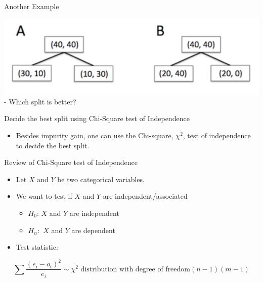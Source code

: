 \documentclass[
  ignorenonframetext,
]{beamer}
\providecommand{\tightlist}{%
  \setlength{\itemsep}{0pt}\setlength{\parskip}{0pt}}
\begin{document}
\begin{frame}{Another Example}
\protect\hypertarget{another-example}{}

\includegraphics{images2/i1.png} - Which split is better?

\end{frame}

\begin{frame}{Decide the best split using Chi-Square test of
Independence}
\protect\hypertarget{decide-the-best-split-using-chi-square-test-of-independence}{}

\begin{itemize}
\tightlist
\item
  Besides impurity gain, one can use the Chi-square, \(\chi^2\), test of
  independence to decide the best split.
\end{itemize}

\end{frame}

\begin{frame}{Review of Chi-Square test of Independence}
\protect\hypertarget{review-of-chi-square-test-of-independence}{}

\begin{itemize}
\tightlist
\item
  Let \(X\) and \(Y\) be two categorical variables.
\item
  We want to test if \(X\) and \(Y\) are independent/associated

  \begin{itemize}
  \tightlist
  \item
    \(H_0\): \(X\) and \(Y\) are independent
  \item
    \(H_{\alpha}:\) \(X\) and \(Y\) are dependent
  \end{itemize}
\item
  Test statistic:
\end{itemize}

\[\sum\frac{(e_i-o_i)^2}{e_i} \sim \chi^2 \text{ distribution with degree of freedom} (n-1)(m-1)\]

\end{frame}
\end{document}

